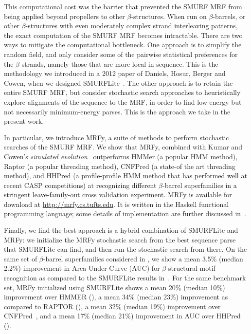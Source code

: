\documentclass[blockstyle,times,preprint]{sigplanconf}
\begin{document}
This computational cost was the barrier that prevented the SMURF MRF
from being applied beyond propellers to other $\beta$-structures.
When run on $\beta$-barrels, or other $\beta$-structures with
even moderately complex strand interleaving patterns, the exact
computation of the SMURF MRF becomes intractable. 
There are two ways to mitigate the computational bottleneck. 
One approach is to simplify the random field, and only consider some of the 
pairwise statistical preferences for the $\beta$-strands, namely those that are more local in 
sequence.
This is the methodology we introduced in a 2012 paper of Daniels, Hosur, Berger
and Cowen, when we designed SMURFLite~\cite{Daniels:2012dg}. 
The other approach is to retain the entire SMURF MRF, but consider
stochastic search approaches to heuristically explore alignments of the
sequence to the MRF, in order to find low-energy but not necessarily
minimum-energy parses.
This is the approach we take in the present work.

In particular, we introduce MRFy, a suite of methods to perform
stochastic searches of the SMURF MRF. 
We show that MRFy, combined with Kumar and Cowen's 
{\em simulated evolution\/}~\cite{Kumar:2009tp, Kumar:2010wv}
outperforms HMMer (a popular HMM method), Raptor (a popular threading method), 
CNFPred (a state-of the art threading 
method), and HHPred (a profile-profile HMM method that has performed well at 
recent CASP competitions) at recognizing different $\beta$-barrel superfamilies
in a stringent leave-family-out cross validation experiment. 
MRFy is available for download at \url{http://mrfy.cs.tufts.edu}. 
It is written in the Haskell functional programming language; some details of 
implementation are further discussed in~\cite{Daniels:2012cm}.

Finally, we find the best approach is a hybrid combination of
SMURFLite and MRFy: we initialize the MRFy stochastic search from the
best sequence parse that SMURFLite can find, and then run the
stochastic search from there. On the same set of $\beta$-barrel superfamilies 
considered in \cite{Daniels:2012dg}, we show a mean 3.5\% (median 2.2\%) 
improvement in Area Under Curve (AUC) for
$\beta$-structural motif recognition as compared to the SMURFLite results 
in~\cite{Daniels:2012dg}.
For the same benchmark set, MRFy initialized using SMURFLite shows a mean 20\% 
(median 10\%) improvement over HMMER (\cite{Eddy:1998ut}), a mean 34\% (median
23\%) improvement as compared to RAPTOR (\cite{Xu:2003p3417}),
a mean 32\% (median 19\%) improvement over CNFPred~\cite{JianzhuMa:2012cp},
and a mean 17\% (median 21\%) improvement in AUC 
over HHPred (\cite{Soding:2005ff}).
\end{document}
